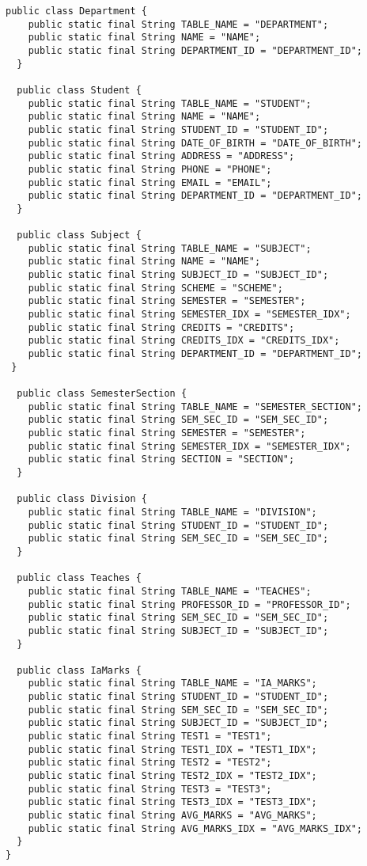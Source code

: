 \begin{lstlisting}[caption=DatabaseContract.java]
  public class Department {
    public static final String TABLE_NAME = "DEPARTMENT";
    public static final String NAME = "NAME";
    public static final String DEPARTMENT_ID = "DEPARTMENT_ID";
  }

  public class Student {
    public static final String TABLE_NAME = "STUDENT";
    public static final String NAME = "NAME";
    public static final String STUDENT_ID = "STUDENT_ID";
    public static final String DATE_OF_BIRTH = "DATE_OF_BIRTH";
    public static final String ADDRESS = "ADDRESS";
    public static final String PHONE = "PHONE";
    public static final String EMAIL = "EMAIL";
    public static final String DEPARTMENT_ID = "DEPARTMENT_ID";
  }

  public class Subject {
    public static final String TABLE_NAME = "SUBJECT";
    public static final String NAME = "NAME";
    public static final String SUBJECT_ID = "SUBJECT_ID";
    public static final String SCHEME = "SCHEME";
    public static final String SEMESTER = "SEMESTER";
    public static final String SEMESTER_IDX = "SEMESTER_IDX";
    public static final String CREDITS = "CREDITS";
    public static final String CREDITS_IDX = "CREDITS_IDX";
    public static final String DEPARTMENT_ID = "DEPARTMENT_ID";
 }

  public class SemesterSection {
    public static final String TABLE_NAME = "SEMESTER_SECTION";
    public static final String SEM_SEC_ID = "SEM_SEC_ID";
    public static final String SEMESTER = "SEMESTER";
    public static final String SEMESTER_IDX = "SEMESTER_IDX";
    public static final String SECTION = "SECTION";
  }

  public class Division {
    public static final String TABLE_NAME = "DIVISION";
    public static final String STUDENT_ID = "STUDENT_ID";
    public static final String SEM_SEC_ID = "SEM_SEC_ID";
  }

  public class Teaches {
    public static final String TABLE_NAME = "TEACHES";
    public static final String PROFESSOR_ID = "PROFESSOR_ID";
    public static final String SEM_SEC_ID = "SEM_SEC_ID";
    public static final String SUBJECT_ID = "SUBJECT_ID";
  }

  public class IaMarks {
    public static final String TABLE_NAME = "IA_MARKS";
    public static final String STUDENT_ID = "STUDENT_ID";
    public static final String SEM_SEC_ID = "SEM_SEC_ID";
    public static final String SUBJECT_ID = "SUBJECT_ID";
    public static final String TEST1 = "TEST1";
    public static final String TEST1_IDX = "TEST1_IDX";
    public static final String TEST2 = "TEST2";
    public static final String TEST2_IDX = "TEST2_IDX";
    public static final String TEST3 = "TEST3";
    public static final String TEST3_IDX = "TEST3_IDX";
    public static final String AVG_MARKS = "AVG_MARKS";
    public static final String AVG_MARKS_IDX = "AVG_MARKS_IDX";
  }
}
\end{lstlisting}

